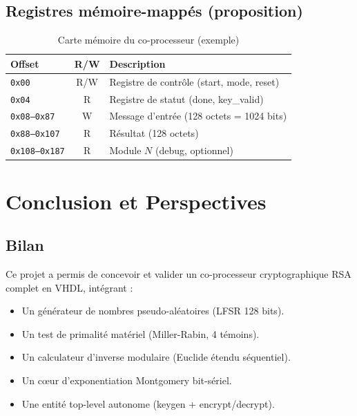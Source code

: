 \subsection{Registres mémoire-mappés (proposition)}

\begin{table}[H]
\centering
\caption{Carte mémoire du co-processeur (exemple)}
\begin{tabular}{lcp{6cm}}
\toprule
\textbf{Offset} & \textbf{R/W} & \textbf{Description} \\
\midrule
\texttt{0x00} & R/W & Registre de contrôle (start, mode, reset) \\
\texttt{0x04} & R   & Registre de statut (done, key\_valid) \\
\texttt{0x08--0x87} & W & Message d'entrée (128 octets = 1024 bits) \\
\texttt{0x88--0x107} & R & Résultat (128 octets) \\
\texttt{0x108--0x187} & R & Module $N$ (debug, optionnel) \\
\bottomrule
\end{tabular}
\end{table}

\section{Conclusion et Perspectives}
\label{ch:conclusion}

\subsection{Bilan}
Ce projet a permis de concevoir et valider un co-processeur cryptographique
RSA complet en VHDL, intégrant :
\begin{itemize}
  \item Un générateur de nombres pseudo-aléatoires (LFSR 128 bits).
  \item Un test de primalité matériel (Miller-Rabin, 4 témoins).
  \item Un calculateur d'inverse modulaire (Euclide étendu séquentiel).
  \item Un cœur d'exponentiation Montgomery bit-sériel.
  \item Une entité top-level autonome (keygen + encrypt/decrypt).
\end{itemize}

